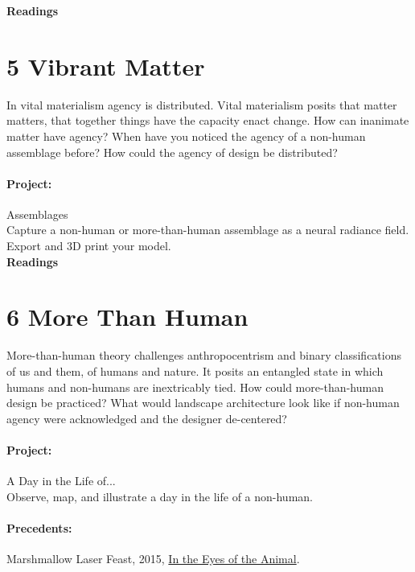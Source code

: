 \documentclass[11pt,article,oneside]{memoir}
\begin{document}
\noindent
\textbf{Readings}
\nocite{*}
\setlength{}
\printbibliography[keyword=xenofeminism, heading=none]

\section{5 Vibrant Matter}

In vital materialism agency is distributed. 
Vital materialism 
posits that matter matters,
that together things 
have the capacity enact change.
How can inanimate matter have agency? 
When have you noticed the agency of a non-human assemblage before?
How could the agency of design be distributed? 

\paragraph{Project:} Assemblages \\

\noindent
Capture a non-human or more-than-human assemblage 
as a neural radiance field. 
Export and 3D print your model. 
\\

\noindent
\textbf{Readings}
\nocite{*}
\setlength{}
\printbibliography[keyword=vibrant-matter, heading=none]

\section{6 More Than Human}  

More-than-human theory
challenges anthropocentrism and
binary classifications
of us and them,
of humans and nature.
It posits an entangled state
in which humans and non-humans
are inextricably tied.
How could more-than-human design be practiced?
What would landscape architecture look like 
if non-human agency were acknowledged
and the designer de-centered? 

\paragraph{Project:} A Day in the Life of... \\

\noindent
Observe, map, and illustrate a day in the life of a non-human.

\paragraph{Precedents:} 
Marshmallow Laser Feast, 2015, \href{http://intheeyesoftheanimal.com/}{In the Eyes of the Animal}.
\\
\end{document}
